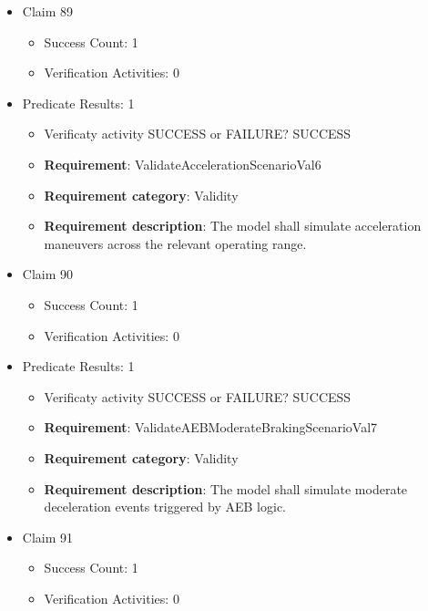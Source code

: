\documentclass{article}
\begin{document}
\begin{itemize}
  				  \item Claim 89
				\begin{itemize}
			    	\item Success Count: 1 
			    	\item Verification Activities: 0
				\end{itemize}
				
									    
				\item Predicate Results: 1
					\begin{itemize}				
					\item Verificaty activity SUCCESS or FAILURE? SUCCESS
					
					\item \textbf{Requirement}: ValidateAccelerationScenarioVal6 
					\item \textbf{Requirement category}: Validity
					\item \textbf{Requirement description}: The model shall simulate acceleration maneuvers across the relevant operating range.
					\end{itemize}

  				  \item Claim 90
				\begin{itemize}
			    	\item Success Count: 1 
			    	\item Verification Activities: 0
				\end{itemize}
				
									    
				\item Predicate Results: 1
					\begin{itemize}				
					\item Verificaty activity SUCCESS or FAILURE? SUCCESS
					
					\item \textbf{Requirement}: ValidateAEBModerateBrakingScenarioVal7 
					\item \textbf{Requirement category}: Validity
					\item \textbf{Requirement description}: The model shall simulate moderate deceleration events triggered by AEB logic.
					\end{itemize}

  				  \item Claim 91
				\begin{itemize}
			    	\item Success Count: 1 
			    	\item Verification Activities: 0
				\end{itemize}
				

\end{itemize}
\end{document}
